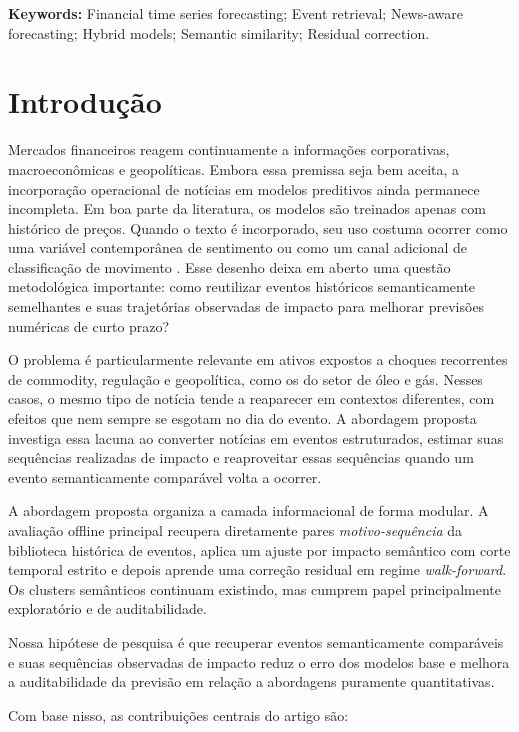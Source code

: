 \documentclass[12pt]{article}
\begin{document}
\noindent\textbf{Keywords:} Financial time series forecasting; Event retrieval; News-aware forecasting; Hybrid models; Semantic similarity; Residual correction.

\section{Introdução}

Mercados financeiros reagem continuamente a informações corporativas, macroeconômicas e geopolíticas. Embora essa premissa seja bem aceita, a incorporação operacional de notícias em modelos preditivos ainda permanece incompleta. Em boa parte da literatura, os modelos são treinados apenas com histórico de preços. Quando o texto é incorporado, seu uso costuma ocorrer como uma variável contemporânea de sentimento ou como um canal adicional de classificação de movimento \cite{Tetlock:2007, Tetlock:2008, Xu:2018, Sawhney:2020}. Esse desenho deixa em aberto uma questão metodológica importante: como reutilizar eventos históricos semanticamente semelhantes e suas trajetórias observadas de impacto para melhorar previsões numéricas de curto prazo?

O problema é particularmente relevante em ativos expostos a choques recorrentes de commodity, regulação e geopolítica, como os do setor de óleo e gás. Nesses casos, o mesmo tipo de notícia tende a reaparecer em contextos diferentes, com efeitos que nem sempre se esgotam no dia do evento. A abordagem proposta investiga essa lacuna ao converter notícias em eventos estruturados, estimar suas sequências realizadas de impacto e reaproveitar essas sequências quando um evento semanticamente comparável volta a ocorrer.

A abordagem proposta organiza a camada informacional de forma modular. A avaliação offline principal recupera diretamente pares \textit{motivo-sequência} da biblioteca histórica de eventos, aplica um ajuste por impacto semântico com corte temporal estrito e depois aprende uma correção residual em regime \textit{walk-forward}. Os clusters semânticos continuam existindo, mas cumprem papel principalmente exploratório e de auditabilidade.

Nossa hipótese de pesquisa é que recuperar eventos semanticamente comparáveis e suas sequências observadas de impacto reduz o erro dos modelos base e melhora a auditabilidade da previsão em relação a abordagens puramente quantitativas.

Com base nisso, as contribuições centrais do artigo são:
\end{document}
